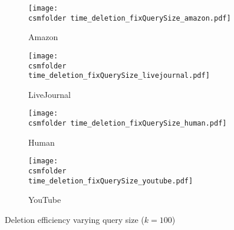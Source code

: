 \begin{figure}[h!]
\def\wscorevone{0.35}
\centering
    \begin{subfigure}[t]{\wscorevone\linewidth}
	    \centering
	    \resizebox{\linewidth}{!}
	    {
	        \texttt{[image: \\csmfolder time\_deletion\_fixQuerySize\_amazon.pdf]}
	    }
	    \caption{Amazon}
	    \label{fig:time:deletion:fixQuerySize:amazon}
    \end{subfigure}
    \begin{subfigure}[t]{\wscorevone\linewidth}
        \centering
        \resizebox{\linewidth}{!}
        {
            \texttt{[image: \\csmfolder  time\_deletion\_fixQuerySize\_livejournal.pdf]}
        }
        \caption{LiveJournal}
        \label{fig:time:deletion:fixQuerySize:livejournal}
    \end{subfigure}
     \begin{subfigure}[t]{\wscorevone\linewidth}
         \centering
         \resizebox{\linewidth}{!}
         {
             \texttt{[image: \\csmfolder  time\_deletion\_fixQuerySize\_human.pdf]}
         }
         \caption{Human}
         \label{fig:time:deletion:fixQuerySize:human}
     \end{subfigure}
     \begin{subfigure}[t]{\wscorevone\linewidth}
         \centering
         \resizebox{\linewidth}{!}
         {
             \texttt{[image: \\csmfolder  time\_deletion\_fixQuerySize\_youtube.pdf]}
         }
         \caption{YouTube}
         \label{fig:time:deletion:fixQuerySize:youtube}
     \end{subfigure}
\caption{Deletion efficiency varying query size ($k=100$)}
\label{fig:time:deletion:fixQuerySize}
\end{figure}
